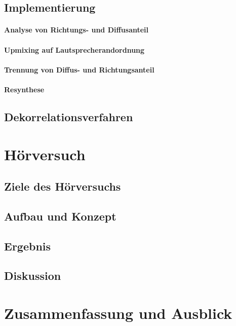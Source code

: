 \documentclass[12pt, a4paper]{article}
\begin{document}
    \subsection{Implementierung}
    
        \paragraph{Analyse von Richtungs- und Diffusanteil}
        
        \paragraph{Upmixing auf Lautsprecherandordnung}
        
        \paragraph{Trennung von Diffus- und Richtungsanteil}
        
        \paragraph{Resynthese}
        

    \subsection{Dekorrelationsverfahren}
    


\section{Hörversuch}
    \subsection{Ziele des Hörversuchs}
    
    \subsection{Aufbau und Konzept}
    
    \subsection{Ergebnis}
    
    \subsection{Diskussion}
    

\section{Zusammenfassung und Ausblick}




\end{document}
